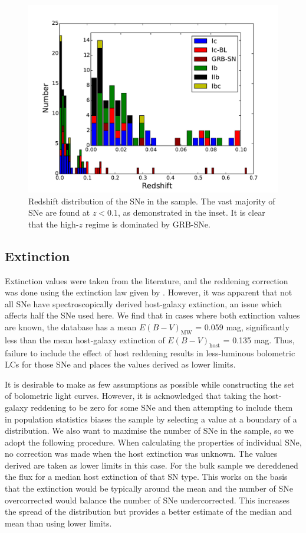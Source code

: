 \documentclass[a4paper,fleqn,usenatbib]{mnras}
\begin{document}
\begin{figure}
\centering
\includegraphics[scale=0.9]{redshift_histogram_sub.pdf}
\caption{Redshift distribution of the SNe in the sample. The vast majority of SNe are found at $z < 0.1$, as demonstrated in the inset. It is clear that the high-$z$ regime is dominated by GRB-SNe.}
\label{fig:redshift}
\end{figure}

\subsection{Extinction}
Extinction values were taken from the literature, and the reddening correction was done using the extinction law given by \cite{CCM}. However, it was apparent that not all SNe have spectroscopically derived host-galaxy extinction, an issue which affects half the SNe used here. We find that in cases where both extinction values are known, the database has a mean $E(B-V)_{\mathrm{MW}}$ = 0.059 mag, significantly less than the mean host-galaxy extinction of $E(B-V)_{\mathrm{host}}$ = 0.135 mag. Thus, failure to include the effect of host reddening results in less-luminous bolometric LCs for those SNe and places the values derived as lower limits. 

It is desirable to make as few assumptions as possible while constructing the set of bolometric light curves. However, it is acknowledged that taking the host-galaxy reddening to be zero for some SNe and then attempting to include them in population statistics  biases the sample by selecting a value at a boundary of a distribution. We also want to maximise the number of SNe in the sample, so we adopt the following procedure. When calculating the properties of individual SNe, no correction was made when the host extinction was unknown. The values derived are taken as lower limits in this case. For the bulk sample we dereddened the flux for a median host extinction of that SN type. This works on the basis that the extinction would be typically around the mean and the number of SNe overcorrected would balance the number of SNe undercorrected. This increases the spread of the distribution but provides a better estimate of the median and mean than using lower limits.  
\end{document}
